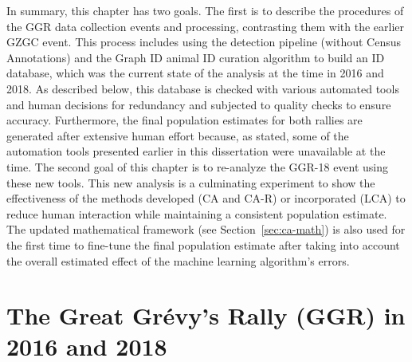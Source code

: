 In summary, this chapter has two goals.  The first is to describe the procedures of the GGR data collection events and processing, contrasting them with the earlier GZGC event.  This process includes using the detection pipeline (without Census Annotations) and the Graph ID animal ID curation algorithm to build an ID database, which was the current state of the analysis at the time in 2016 and 2018.  As described below, this database is checked with various automated tools and human decisions for redundancy and subjected to quality checks to ensure accuracy.  Furthermore, the final population estimates for both rallies are generated after extensive human effort because, as stated, some of the automation tools presented earlier in this dissertation were unavailable at the time.  The second goal of this chapter is to re-analyze the GGR-18 event using these new tools.  This new analysis is a culminating experiment to show the effectiveness of the methods developed (CA and CA-R) or incorporated (LCA) to reduce human interaction while maintaining a consistent population estimate.  The updated mathematical framework (see Section~\ref{sec:ca-math}) is also used for the first time to fine-tune the final population estimate after taking into account the overall estimated effect of the machine learning algorithm's errors.

\section{The Great Gr\'evy's Rally (GGR) in 2016 and 2018}

